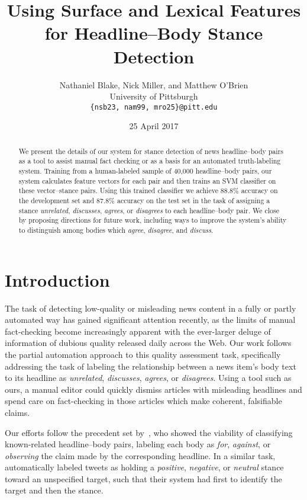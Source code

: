 \documentclass[11pt,a4paper]{article}
\title{Using Surface and Lexical Features for Headline--Body Stance Detection}
\author{Nathaniel Blake, Nick Miller, and Matthew O'Brien \\
  University of Pittsburgh \\
	{\tt \{nsb23, nam99, mro25\}@pitt.edu}}
\date{25 April 2017}
\begin{document}
\maketitle
\begin{abstract}
	We present the details of our system for stance detection of news headline--body pairs as a tool to assist manual fact checking or as a basis for an automated truth-labeling system. Training from a human-labeled sample of 40,000 headline--body pairs, our system calculates feature vectors for each pair and then trains an SVM classifier on these vector--stance pairs. Using this trained classifier we achieve 88.8\% accuracy on the development set and 87.8\% accuracy on the test set in the task of assigning a stance \textit{unrelated}, \textit{discusses}, \textit{agrees}, or \textit{disagrees} to each headline--body pair. We close by proposing directions for future work, including ways to improve the system's ability to distinguish among bodies which \textit{agree}, \textit{disagree}, and \textit{discuss}.
\end{abstract}

\section{Introduction}
The task of detecting low-quality or misleading news content in a fully or partly automated way has gained significant attention recently, as the limits of manual fact-checking become increasingly apparent with the ever-larger deluge of information of dubious quality released daily across the Web. Our work follows the partial automation approach to this quality assessment task, specifically addressing the task of labeling the relationship between a news item's body text to its headline as \textit{unrelated}, \textit{discusses}, \textit{agrees}, or \textit{disagrees}. Using a tool such as ours, a manual editor could quickly dismiss articles with misleading headlines and spend care on fact-checking in those articles which make coherent, falsifiable claims.

Our efforts follow the precedent set by~\cite{ferreira2016emergent}, who showed the viability of classifying known-related headline--body pairs, labeling each body as \textit{for}, \textit{against}, or \textit{observing} the claim made by the corresponding headline. In a similar task,~\cite{Augenstein16} automatically labeled tweets as holding a \textit{positive}, \textit{negative}, or \textit{neutral} stance toward an unspecified target, such that their system had first to identify the target and then the stance.
\end{document}
